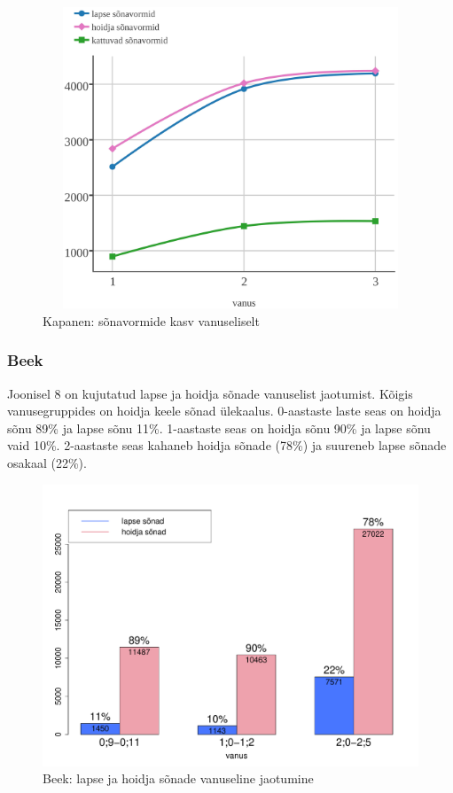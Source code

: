 \documentclass[12pt]{article}
\begin{document}


\begin{figure}[H]
    \centering
    \includegraphics[width=12cm, height=9cm]{kapanen_kum_crop}
    \caption{Kapanen: sõnavormide kasv vanuseliselt}
\end{figure}




\subsubsection{Beek}

Joonisel 8 on kujutatud lapse ja hoidja sõnade vanuselist jaotumist. Kõigis vanusegruppides on hoidja keele sõnad ülekaalus. 0-aastaste laste seas on hoidja sõnu 89\% ja lapse sõnu 11\%. 1-aastaste seas on hoidja sõnu 90\% ja lapse sõnu vaid 10\%. 2-aastaste seas kahaneb hoidja sõnade (78\%) ja suureneb lapse sõnade osakaal (22\%).

\begin{figure}[H]
    \centering
    \includegraphics[width=12cm]{beek_vanus_sonad}
    \caption{Beek: lapse ja hoidja sõnade vanuseline jaotumine}
\end{figure}
\end{document}
